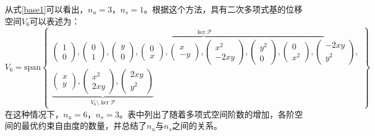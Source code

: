 从式\eqref{base1}可以看出，$n_u=3$，$n_s=1$。根据这个方法，具有二次多项式基的位移空间$V_6$可以表述为：
\begin{equation}\label{base2}
    V_6 = \mathrm{span}
    \begin{Bmatrix}
        \overbrace{
        \begin{pmatrix} 1 \\ 0 \end{pmatrix},
        \begin{pmatrix} 0 \\ 1 \end{pmatrix},
        \begin{pmatrix} y \\ 0 \end{pmatrix},
        \begin{pmatrix} 0 \\ x \end{pmatrix},
        \begin{pmatrix} x \\ -y \end{pmatrix},
        \begin{pmatrix} x^2 \\ -2xy \end{pmatrix},
        \begin{pmatrix} y^2 \\ 0 \end{pmatrix},
        \begin{pmatrix} 0 \\ x^2 \end{pmatrix},
        \begin{pmatrix} -2xy \\ y^2 \end{pmatrix}
        }^{\ker \mathcal P}, \\
        \underbrace{
        \begin{pmatrix} x \\ y \end{pmatrix},
        \begin{pmatrix} x^2 \\ 2xy \end{pmatrix},
        \begin{pmatrix} 2xy \\ y^2 \end{pmatrix}
        }_{V_6\setminus \ker \mathcal P}
    \end{Bmatrix}
\end{equation}
在这种情况下，$n_u=6$，$n_s=3$。表中列出了随着多项式空间阶数的增加，各阶空间的最优约束自由度的数量，并总结了$n_u$与$n_s$之间的关系。
